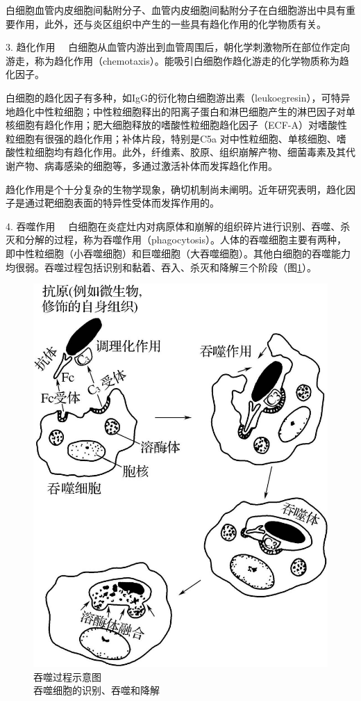 白细胞血管内皮细胞间黏附分子、血管内皮细胞间黏附分子在白细胞游出中具有重要作用，此外，还与炎区组织中产生的一些具有趋化作用的化学物质有关。

{3. 趋化作用}
　白细胞从血管内游出到血管周围后，朝化学刺激物所在部位作定向游走，称为趋化作用（chemotaxis）。能吸引白细胞作趋化游走的化学物质称为趋化因子。

白细胞的趋化因子有多种，如IgG的衍化物白细胞游出素（leukoegresin），可特异地趋化中性粒细胞；中性粒细胞释出的阳离子蛋白和淋巴细胞产生的淋巴因子对单核细胞有趋化作用；肥大细胞释放的嗜酸性粒细胞趋化因子（ECF-A）对嗜酸性粒细胞有很强的趋化作用；补体片段，特别是C{5a}
对中性粒细胞、单核细胞、嗜酸性粒细胞均有趋化作用。此外，纤维素、胶原、组织崩解产物、细菌毒素及其代谢产物、病毒感染的细胞等，多通过激活补体而发挥趋化作用。

趋化作用是个十分复杂的生物学现象，确切机制尚未阐明。近年研究表明，趋化因子是通过靶细胞表面的特异性受体而发挥作用的。

{4. 吞噬作用}
　白细胞在炎症灶内对病原体和崩解的组织碎片进行识别、吞噬、杀灭和分解的过程，称为吞噬作用（phagocytosis）。人体的吞噬细胞主要有两种，即中性粒细胞（小吞噬细胞）和巨噬细胞（大吞噬细胞）。其他白细胞的吞噬能力均很弱。吞噬过程包括识别和黏着、吞入、杀灭和降解三个阶段（图\ref{fig4-3}）。

\begin{figure}[!htbp]
 \centering
 \includegraphics[scale=1.2]{./images/Image00053.jpg}
 \caption{吞噬过程示意图 \\ {\small 吞噬细胞的识别、吞噬和降解}}
 \label{fig4-3}
  \end{figure} 



